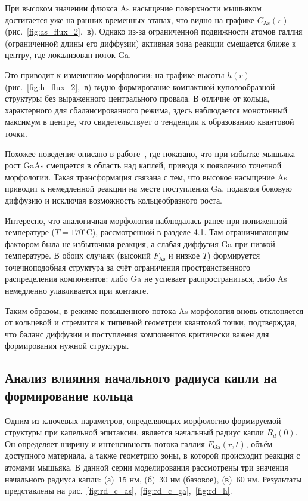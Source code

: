 \documentclass[14pt,oneside]{extarticle}
\begin{document}
При высоком значении флюкса As насыщение поверхности мышьяком достигается уже на ранних временных этапах, что видно на графике $C_{\text{As}}(r)$ (рис.~\ref{fig:as_flux_2},~в). Однако из-за ограниченной подвижности атомов галлия (ограниченной длины его диффузии) активная зона реакции смещается ближе к центру, где локализован поток Ga.

Это приводит к изменению морфологии: на графике высоты $h(r)$ (рис.~\ref{fig:h_flux_2},~в) видно формирование компактной куполообразной структуры без выраженного центрального провала. В отличие от кольца, характерного для сбалансированного режима, здесь наблюдается монотонный максимум в центре, что свидетельствует о тенденции к образованию квантовой точки.

Похожее поведение описано в работе~\cite{okada2020}, где показано, что при избытке мышьяка рост GaAs смещается в область над каплей, приводя к появлению точечной морфологии. Такая трансформация связана с тем, что высокое насыщение As приводит к немедленной реакции на месте поступления Ga, подавляя боковую диффузию и исключая возможность кольцеобразного роста.

Интересно, что аналогичная морфология наблюдалась ранее при пониженной температуре (\(T = 170^\circ\)C), рассмотренной в разделе 4.1. Там ограничивающим фактором была не избыточная реакция, а слабая диффузия Ga при низкой температуре. В обоих случаях (высокий $F_{\text{As}}$ и низкое $T$) формируется точечноподобная структура за счёт ограничения пространственного распределения компонентов: либо Ga не успевает распространиться, либо As немедленно улавливается при контакте.

Таким образом, в режиме повышенного потока As морфология вновь отклоняется от кольцевой и стремится к типичной геометрии квантовой точки, подтверждая, что баланс диффузии и поступления компонентов критически важен для формирования нужной структуры.

\subsection{Анализ влияния начального радиуса капли на формирование кольца}

Одним из ключевых параметров, определяющих морфологию формируемой структуры при капельной эпитаксии, является начальный радиус капли \( R_d(0) \). Он определяет ширину и интенсивность потока галлия \( F_{\text{Ga}}(r, t) \), объём доступного материала, а также геометрию зоны, в которой происходит реакция с атомами мышьяка. В данной серии моделирования рассмотрены три значения начального радиуса капли: (а)~15 нм, (б)~30 нм (базовое), (в)~60 нм. Результаты представлены на рис.~\ref{fig:rd_c_as},~\ref{fig:rd_c_ga},~\ref{fig:rd_h}.
\end{document}
